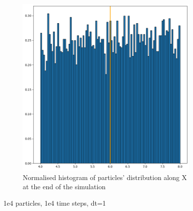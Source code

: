 \documentclass{article}
\begin{document}
\begin{figure}[htbp]
\begin{subfigure}[b]{0.45\textwidth}
        \includegraphics[width=\textwidth]{images/histDl01Dr001RlPlRrPr.png}
        \caption{Normalised histogram of particles' distribution along X at the end of the simulation}
    \end{subfigure}
    \caption{1e4 particles, 1e4 time steps, dt=1}
    \label{fig:MatrixDiffusion4}
\end{figure}

\FloatBarrier  %
\end{document}

